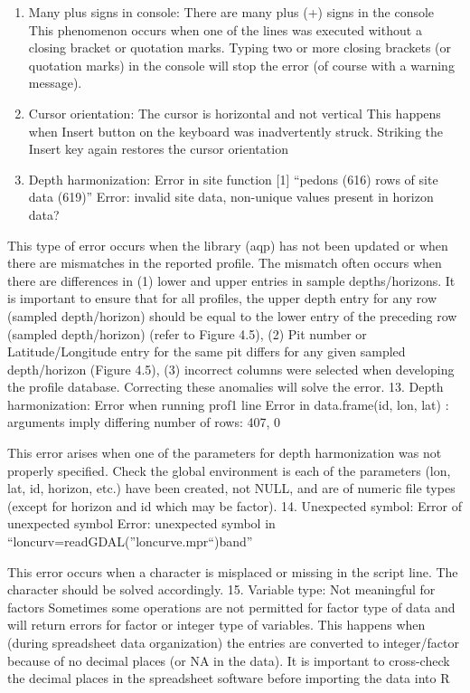 \documentclass[
  10pt,
  b5paper,
]{book}
\providecommand{\tightlist}{%
  \setlength{\itemsep}{0pt}\setlength{\parskip}{0pt}}
\begin{document}
\begin{enumerate}
\def\labelenumi{\arabic{enumi}.}
\setcounter{enumi}{9}
\tightlist
\item
  Many plus signs in console: There are many plus (+) signs in the console
  This phenomenon occurs when one of the lines was executed without a closing bracket or quotation marks. Typing two or more closing brackets (or quotation marks) in the console will stop the error (of course with a warning message).
\item
  Cursor orientation: The cursor is horizontal and not vertical
  This happens when Insert button on the keyboard was inadvertently struck. Striking the Insert key again restores the cursor orientation
\item
  Depth harmonization: Error in site function
  {[}1{]} ``pedons (616) rows of site data (619)''
  Error: invalid site data, non-unique values present in horizon data?
\end{enumerate}

This type of error occurs when the library (aqp) has not been updated or when there are mismatches in the reported profile. The mismatch often occurs when there are differences in (1) lower and upper entries in sample depths/horizons. It is important to ensure that for all profiles, the upper depth entry for any row (sampled depth/horizon) should be equal to the lower entry of the preceding row (sampled depth/horizon) (refer to Figure 4.5), (2) Pit number or Latitude/Longitude entry for the same pit differs for any given sampled depth/horizon (Figure 4.5), (3) incorrect columns were selected when developing the profile database. Correcting these anomalies will solve the error.
13. Depth harmonization: Error when running prof1 line
Error in data.frame(id, lon, lat) :
arguments imply differing number of rows: 407, 0

This error arises when one of the parameters for depth harmonization was not properly specified. Check the global environment is each of the parameters (lon, lat, id, horizon, etc.) have been created, not NULL, and are of numeric file types (except for horizon and id which may be factor).
14. Unexpected symbol: Error of unexpected symbol
Error: unexpected symbol in ``loncurv=readGDAL(''loncurve.mpr``)band''

This error occurs when a character is misplaced or missing in the script line. The character should be solved accordingly.
15. Variable type: Not meaningful for factors
Sometimes some operations are not permitted for factor type of data and will return errors for factor or integer type of variables. This happens when (during spreadsheet data organization) the entries are converted to integer/factor because of no decimal places (or NA in the data). It is important to cross-check the decimal places in the spreadsheet software before importing the data into R
\end{document}
